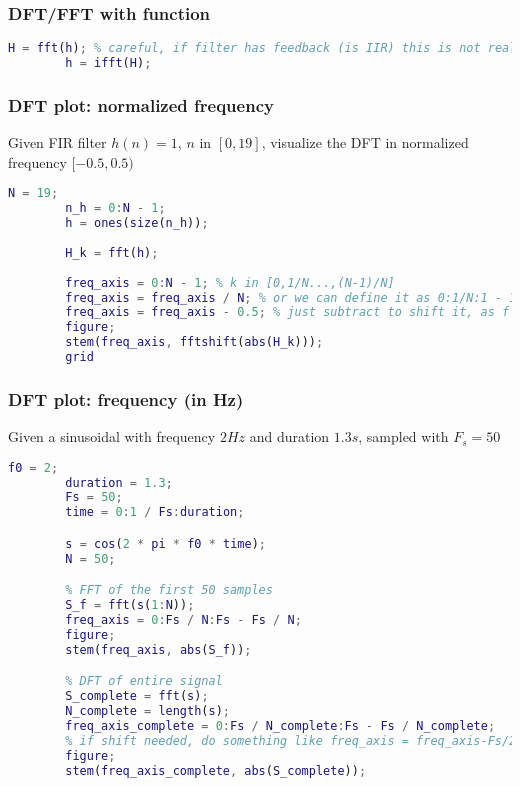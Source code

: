     \subsubsection{DFT/FFT with function}
    \begin{lstlisting}[language=Matlab, escapeinside=`']
        H = fft(h); % careful, if filter has feedback (is IIR) this is not really DFT, we are computing a truncated version
        h = ifft(H); 
    \end{lstlisting}

    \subsubsection{DFT plot: normalized frequency}
    Given FIR filter $h(n)=1$, $n$ in $[0,19]$, visualize the DFT in normalized frequency $[-0.5,0.5)$
    \begin{lstlisting}[language=Matlab, escapeinside=`']
        N = 19;
        n_h = 0:N - 1;
        h = ones(size(n_h));
        
        H_k = fft(h);
        
        freq_axis = 0:N - 1; % k in [0,1/N...,(N-1)/N]
        freq_axis = freq_axis / N; % or we can define it as 0:1/N:1 - 1/N;
        freq_axis = freq_axis - 0.5; % just subtract to shift it, as f normalliy in [0, 1)
        figure;
        stem(freq_axis, fftshift(abs(H_k)));
        grid
    \end{lstlisting}

    \subsubsection{DFT plot: frequency (in Hz)}
    Given a sinusoidal with frequency $2Hz$ and duration $1.3s$, sampled with $F_s=50$
    \begin{lstlisting}[language=Matlab, escapeinside=`']
        f0 = 2;
        duration = 1.3;
        Fs = 50;
        time = 0:1 / Fs:duration;

        s = cos(2 * pi * f0 * time);
        N = 50;

        % FFT of the first 50 samples
        S_f = fft(s(1:N));
        freq_axis = 0:Fs / N:Fs - Fs / N;
        figure;
        stem(freq_axis, abs(S_f));

        % DFT of entire signal
        S_complete = fft(s);
        N_complete = length(s);
        freq_axis_complete = 0:Fs / N_complete:Fs - Fs / N_complete;
        % if shift needed, do something like freq_axis = freq_axis-Fs/2;
        figure;
        stem(freq_axis_complete, abs(S_complete));
    \end{lstlisting}

